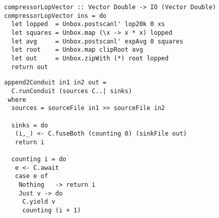 
\begin{lstlisting}[float,label=l:a:bench:compressorLopVector,caption=Vector implementation of \Hs/compressor/ with low-pass]
compressorLopVector :: Vector Double -> IO (Vector Double)
compressorLopVector ins = do
  let lopped  = Unbox.postscanl' lop20k 0 xs
  let squares = Unbox.map (\x -> x * x) lopped
  let avg     = Unbox.postscanl' expAvg 0 squares
  let root    = Unbox.map clipRoot avg
  let out     = Unbox.zipWith (*) root lopped
  return out
\end{lstlisting}

% 

\begin{lstlisting}[float,label=l:a:bench:append2Conduit,caption=Conduit implementation of \Hs/append2/]
append2Conduit in1 in2 out =
  C.runConduit (sources C..| sinks)
 where
  sources = sourceFile in1 >> sourceFile in2

  sinks = do
   (i,_) <- C.fuseBoth (counting 0) (sinkFile out)
   return i

  counting i = do
   e <- C.await
   case e of
    Nothing   -> return i
    Just v -> do
     C.yield v
     counting (i + 1)
\end{lstlisting}

